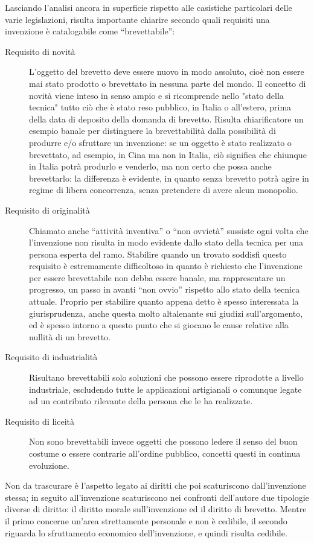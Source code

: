 Lasciando l'analisi ancora in superficie rispetto alle casistiche particolari delle varie legislazioni, risulta importante chiarire secondo quali requisiti una invenzione è catalogabile come ``brevettabile'':
\begin{description}
 \item[Requisito di novità] L'oggetto del brevetto deve essere nuovo in modo assoluto, cioè non essere mai stato prodotto o brevettato in nessuna parte del mondo. Il concetto di novità viene inteso in senso ampio e si ricomprende nello "stato della tecnica" tutto ciò che è stato reso pubblico, in Italia o all’estero, prima della data di deposito della domanda di brevetto. Risulta chiarificatore un esempio banale per distinguere la brevettabilità dalla possibilità di produrre e/o sfruttare un invenzione: se un oggetto è stato realizzato o brevettato, ad esempio, in Cina ma non in Italia, ciò significa che chiunque in Italia potrà produrlo e venderlo, ma non certo che possa anche brevettarlo: la differenza è evidente, in quanto senza brevetto potrà agire in regime di libera concorrenza, senza pretendere di avere alcun monopolio.
\item [Requisito di originalità] Chiamato anche ``attività inventiva'' o ``non ovvietà'' sussiste ogni volta che l'invenzione non risulta in modo evidente dallo stato della tecnica per una persona esperta del ramo. Stabilire quando un trovato soddisfi questo requisito è estremamente difficoltoso in quanto è richiesto che l'invenzione per essere brevettabile non debba essere banale, ma rappresentare un progresso, un passo in avanti ``non ovvio'' rispetto allo stato della tecnica attuale. Proprio per stabilire quanto appena detto è spesso interessata la giurisprudenza, anche questa molto altalenante sui giudizi sull’argomento, ed è spesso intorno a questo punto che si giocano le cause relative alla nullità di un brevetto. 
\item [Requisito di industrialità]Risultano brevettabili solo soluzioni che possono essere riprodotte a livello industriale, escludendo tutte le applicazioni artigianali o comunque legate ad un contributo rilevante della persona che le ha realizzate.
\item [Requisito di liceità]Non sono brevettabili invece oggetti che possono ledere il senso del buon costume o essere contrarie all'ordine pubblico, concetti questi in continua evoluzione.
 \end{description}

Non da trascurare è l'aspetto legato ai diritti che poi scaturiscono dall'invenzione stessa; in seguito all'invenzione scaturiscono nei confronti dell'autore due tipologie diverse di diritto: il diritto morale sull'invenzione ed il diritto di brevetto. Mentre il primo concerne un'area strettamente personale e non è cedibile, il secondo riguarda lo sfruttamento economico dell'invenzione, e quindi risulta cedibile.

